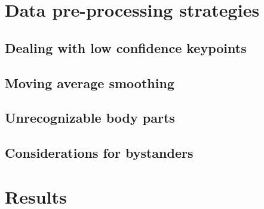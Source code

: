 \section{Data pre-processing strategies}
\label{data-pre-processing-strategies}

\subsection{Dealing with low confidence keypoints}

\subsection{Moving average smoothing}

\subsection{Unrecognizable body parts}

\subsection{Considerations for bystanders}

\section{Results}
\label{pre-processing-results}




